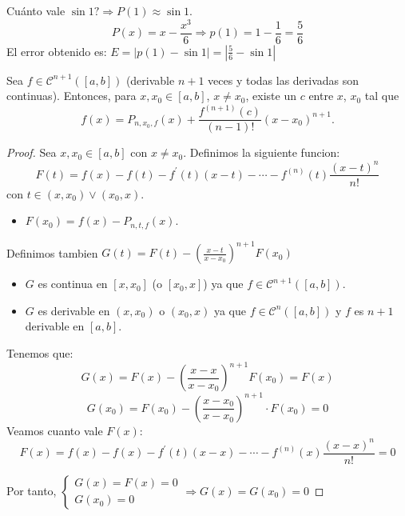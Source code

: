 Cuánto vale \(\sin 1 ? \Rightarrow P(1) \approx \sin 1\).
\[
	P(x) = x - \frac{x^{3} }{6} \Rightarrow p(1) = 1 - \frac{1}{6} = \frac{5}{6}
\]
El error obtenido es: \(E = \left\vert p(1) - \sin 1 \right\vert = \left\vert \frac{5}{6} - \sin 1 \right\vert \)
\begin{theorem}
	Sea \(f \in \mathscr{C}^{n + 1} ([a,b])\) (derivable \(n+ 1 \) veces y todas las derivadas son continuas). Entonces, para \(x, x_0 \in [a,b ]\), \(x \neq x_0 \), existe un \(c \) entre \(x \), \(x_0 \) tal que
	\[
		f(x) = P_{n,x_0,f}(x) + \frac{f^{(n+1)}(c) }{(n-1)!}(x - x_0)^{n+1}.
	\]
\end{theorem}
\begin{proof}
	Sea \(x, x_0 \in [a,b ]\) con \(x \neq  x_0 \). Definimos la siguiente funcion:
	\[
		F(t) = f(x) - f(t) - f^\prime (t) (x - t) - \cdots - f^{(n)}(t) \frac{(x - t)^{n} }{n!}
	\]
	con \(t \in (x, x_0) \vee (x_0, x )\).
	\begin{itemize}
		\item \(F(x_0) = f(x) - P_{n,t,f}(x)\).
	\end{itemize}
	Definimos tambien \(G(t) = F(t) - (\frac{x - t }{x - x_0 })^{n+1} F(x_0) \)
	\begin{itemize}
		\item \(G \) es continua en \([x,x_0 ]\) (o \([x_0, x]\)) ya que \(f \in \mathscr{C}^{n+1}([a,b 	]) \).
		\item \(G \) es derivable en \((x, x_0)\) o \((x_0, x )\) ya que \(f \in \mathscr{C}^{n}([a,b])  \) y \(f \) es \(n+ 1 \) derivable en \([a,b ]\).
	\end{itemize}
	Tenemos que:
	\[
		G(x) = F(x) - (\frac{x - x }{x - x_0})^{n + 1} F(x_0) = F(x)
	\]
	\[
		G(x_0) = F(x_0) - (\frac{x - x_0 }{x - x_0 })^{n + 1} \cdot F(x_0) = 0
	\]
	Veamos cuanto vale \(F(x )\):
	\[
		F(x) = f(x) - f(x) - f^\prime (t) (x - x) - \cdots - f^{(n)}(x) \frac{(x -x)^{n} }{n!} = 0
	\]
	
	Por tanto, \(\begin{cases}
		G(x) = F(x) = 0 \\
		G(x_0) = 0
	\end{cases}\Rightarrow G(x) = G(x_0) = 0\)
	

\end{proof}
